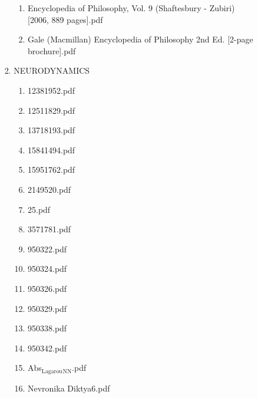 \documentclass[11pt]{article}
\begin{document}
\begin{enumerate}
\begin{enumerate}
\begin{enumerate}
\begin{enumerate}
\begin{enumerate}
\item Encyclopedia of Philosophy, Vol. 9 (Shaftesbury - Zubiri) [2006, 889 pages].pdf
\label{sec-1-1-1-1-7-3-36-11}

\item Gale (Macmillan) Encyclopedia of Philosophy 2nd Ed. [2-page brochure].pdf
\label{sec-1-1-1-1-7-3-36-12}
\end{enumerate}

\item NEURODYNAMICS
\label{sec-1-1-1-1-7-3-37}
\begin{enumerate}
\item 12381952.pdf
\label{sec-1-1-1-1-7-3-37-1}

\item 12511829.pdf
\label{sec-1-1-1-1-7-3-37-2}

\item 13718193.pdf
\label{sec-1-1-1-1-7-3-37-3}

\item 15841494.pdf
\label{sec-1-1-1-1-7-3-37-4}

\item 15951762.pdf
\label{sec-1-1-1-1-7-3-37-5}

\item 2149520.pdf
\label{sec-1-1-1-1-7-3-37-6}

\item 25.pdf
\label{sec-1-1-1-1-7-3-37-7}

\item 3571781.pdf
\label{sec-1-1-1-1-7-3-37-8}

\item 950322.pdf
\label{sec-1-1-1-1-7-3-37-9}

\item 950324.pdf
\label{sec-1-1-1-1-7-3-37-10}

\item 950326.pdf
\label{sec-1-1-1-1-7-3-37-11}

\item 950329.pdf
\label{sec-1-1-1-1-7-3-37-12}

\item 950338.pdf
\label{sec-1-1-1-1-7-3-37-13}

\item 950342.pdf
\label{sec-1-1-1-1-7-3-37-14}

\item Abs$_{\text{Lagarou}}$$_{\text{NN}}$.pdf
\label{sec-1-1-1-1-7-3-37-15}

\item Nevronika Diktya6.pdf
\label{sec-1-1-1-1-7-3-37-16}


\end{enumerate}
\end{enumerate}
\end{enumerate}
\end{enumerate}
\end{enumerate}
\end{document}
